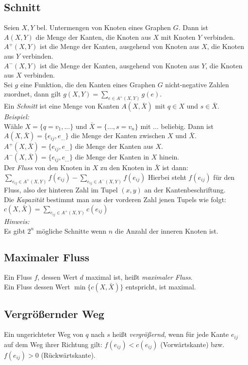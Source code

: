 \subsection*{Schnitt}
Seien $X,Y$ bel. Untermengen von Knoten eines Graphen $G$. Dann ist\\
$A(X,Y)$ die Menge der Kanten, die Knoten aus $X$ mit Knoten $Y$ verbinden.\\
$A^+(X,Y)$ ist die Menge der Kanten, ausgehend von Knoten aus $X$, die Knoten aus $Y$
verbinden.\\
$A^-(X,Y)$ ist die Menge der Kanten, ausgehend von Knoten aus $Y$, die Knoten aus $X$
verbinden.\\
Sei $g$ eine Funktion, die den Kanten eines Graphen $G$ nicht-negative Zahlen zuordnet, dann
gilt $g(X,Y)=\sum_{e\in A^+(X,Y)}g(e)$.\\
Ein \emph{Schnitt} ist eine Menge von Kanten $A(X,\bar{X})$ mit $q\in X$ und $s\in\bar{X}$.\\
\emph{Beispiel:}\\
Wähle $X=\{q=v_1,...\}$ und $\bar{X}=\{...,s=v_n\}$ mit $...$ beliebig. Dann ist $A(X,\bar{X})=\{e_{ij},e_{...}\}$ die Menge der Kanten zwischen $X$ und $\bar{X}$.\\
$A^+(X,\bar{X})=\{e_{ij},e_{...}\}$ die Menge der Kanten aus $X$.\\
$A^-(X,\bar{X})=\{e_{ij},e_{...}\}$ die Menge der Kanten in $X$ hinein.\\
Der \emph{Fluss} von den Knoten in $X$ zu den Knoten in $\bar{X}$ ist dann:\\
$\sum_{e_{ij}\in A^+(X,Y)}f(e_{ij})-\sum_{e_{ij}\in A^-(X,Y)}f(e_{ij})$ Hierbei steht $f(e_{ij})$ für den Fluss, also der hinteren Zahl im Tupel $(x,y)$ an der Kantenbeschriftung.\\
Die \emph{Kapazität} bestimmt man aus der vorderen Zahl jenen Tupels wie folgt:\\
$c(X,\bar{X})=\sum_{e_{ij}\in A^+(X,Y)}c(e_{ij})$\\
\emph{Hinweis:}\\
Es gibt $2^n$ mögliche Schnitte wenn $n$ die Anzahl der inneren Knoten ist.
\subsection*{Maximaler Fluss}
Ein Fluss $f$, dessen Wert $d$ maximal ist, heißt \emph{maximaler Fluss}.\\
Ein Fluss dessen Wert $\min\{c(X,\bar{X})\}$ entspricht, ist maximal.
\subsection*{Vergrößernder Weg}
Ein ungerichteter Weg von $q$ nach $s$ heißt \emph{vergrößernd}, wenn
für jede Kante $e_{ij}$ auf dem Weg ihrer Richtung gilt: $f(e_{ij})<c(e_{ij})$
(Vorwärtskante) bzw. $f(e_{ij})>0$ (Rückwärtskante).
